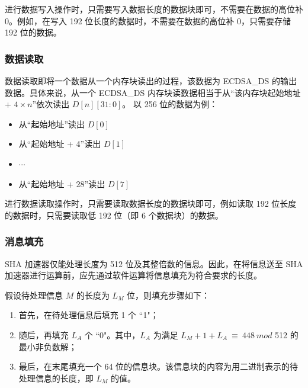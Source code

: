 \documentclass[main\_\_CN.tex]{subfiles}
\begin{document}
\begin{tiplisting}
进行数据写入操作时，只需要写入数据长度的数据块即可，不需要在数据的高位补 0。例如，在写入 192 位长度的数据时，不需要在数据的高位补 0，只需要存储 192 位的数据。
\end{tiplisting}

\subsubsection{数据读取}

数据读取即将一个数据从一个内存块读出的过程，该数据为 ECDSA\_DS 的输出数据。具体来说，从一个 ECDSA\_DS 内存块读数据相当于从“该内存块起始地址 + $4 \times n$”依次读出 $D[n][31:0]$。
以 256 位的数据为例：
\begin{itemize}
    \item 从“起始地址”读出 $D[0]$
    \item 从“起始地址 + 4”读出 $D[1]$
    \item $\cdots$
    \item 从“起始地址 + 28”读出 $D[7]$
\end{itemize}

\begin{tiplisting}
进行数据读取操作时，只需要读取数据长度的数据块即可，例如读取 192 位长度的数据时，只需要读取低 192 位（即 6 个数据块）的数据。
\end{tiplisting}

\subsubsection{消息填充}\label{sec:ecdsa-msg-padding}

SHA 加速器仅能处理长度为 512 位及其整倍数的信息。因此，在将信息送至 SHA 加速器进行运算前，应先通过软件运算将信息填充为符合要求的长度。

假设待处理信息 \begin{math} M \end{math} 的长度为 \begin{math}L_M\end{math} 位，则填充步骤如下：

\begin{enumerate}
    \item 首先，在待处理信息后填充 1 个 ``1"；
    \item 随后，再填充 \begin{math}L_A\end{math} 个 ``0"。其中，\begin{math}L_A\end{math} 为满足 \begin{math} L_M + 1 + L_A \ {\equiv} \ 448 \ mod \end{math} 512 的最小非负数解；
    \item 最后，在末尾填充一个 64 位的信息块。该信息块的内容为用二进制表示的待处理信息的长度，即 \begin{math}L_M\end{math} 的值。
\end{enumerate}
\end{document}
